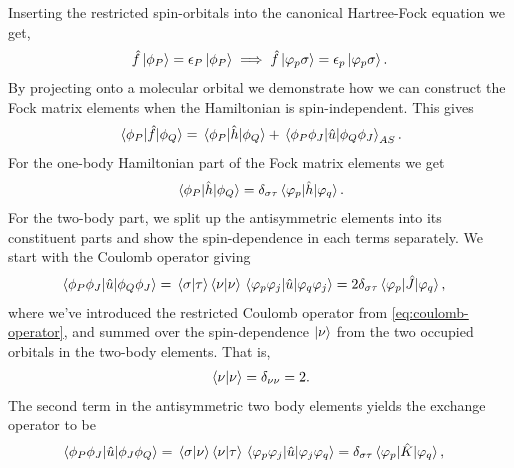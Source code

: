             Inserting the restricted spin-orbitals into the canonical
            Hartree-Fock equation we get,
            \begin{align}
                \hat{f}\ket*{\phi_P} = \epsilon_P\ket*{\phi_P}
                \implies
                \hat{f}\ket*{\varphi_p\sigma}
                = \epsilon_{p}\ket*{\varphi_p\sigma}.
            \end{align}
            By projecting onto a molecular orbital we demonstrate how we can
            construct the Fock matrix elements when the Hamiltonian is
            spin-independent.
            This gives
            \begin{align}
                \mel*{\phi_P}{\hat{f}}{\phi_Q}
                = \mel*{\phi_P}{\hat{h}}{\phi_Q}
                + \mel*{\phi_P\phi_J}{\hat{u}}{\phi_Q\phi_J}_{AS}.
                \label{eq:mo-fock-elements}
            \end{align}
            For the one-body Hamiltonian part of the Fock matrix elements we get
            \begin{align}
                \mel*{\phi_P}{\hat{h}}{\phi_Q}
                = \delta_{\sigma\tau}\mel*{\varphi_p}{\hat{h}}{\varphi_q}.
            \end{align}
            For the two-body part, we split up the antisymmetric elements into
            its constituent parts and show the spin-dependence in each terms
            separately.
            We start with the Coulomb operator giving
            \begin{align}
                \mel*{\phi_P\phi_J}{\hat{u}}{\phi_Q\phi_J}
                &= \braket*{\sigma}{\tau}\braket{\nu}{\nu}
                \mel*{\varphi_p\varphi_j}{\hat{u}}{\varphi_q\varphi_j}
                = 2 \delta_{\sigma\tau}
                \mel*{\varphi_p}{\hat{J}}{\varphi_q},
            \end{align}
            where we've introduced the restricted Coulomb operator from
            \autoref{eq:coulomb-operator}, and summed over the spin-dependence
            $\ket{\nu}$ from the two occupied orbitals in the two-body elements.
            That is,
            \begin{align}
                \braket*{\nu}{\nu} = \delta_{\nu\nu} = 2.
            \end{align}
            The second term in the antisymmetric two body elements yields the
            exchange operator to be
            \begin{align}
                \mel*{\phi_P\phi_J}{\hat{u}}{\phi_J\phi_Q}
                &= \braket*{\sigma}{\nu}\braket{\nu}{\tau}
                \mel*{\varphi_p\varphi_j}{\hat{u}}{\varphi_j\varphi_q}
                = \delta_{\sigma\tau}
                \mel*{\varphi_p}{\hat{K}}{\varphi_q},
            \end{align}
